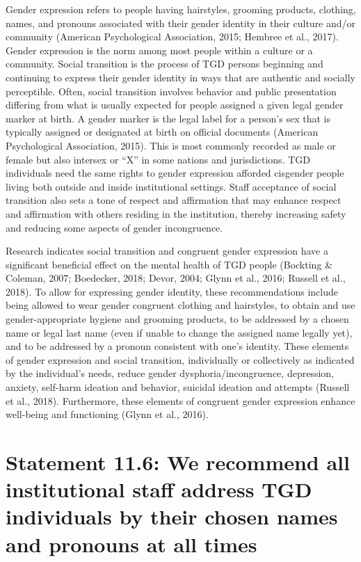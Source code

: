 \documentclass[
]{book}
\begin{document}
Gender expression refers to people having
hairstyles, grooming products, clothing, names,
and pronouns associated with their gender identity in their culture and/or community (American
Psychological Association, 2015; Hembree et al.,
2017). Gender expression is the norm among
most people within a culture or a community.
Social transition is the process of TGD persons
beginning and continuing to express their gender identity in ways that are authentic and
socially perceptible. Often, social transition
involves behavior and public presentation differing from what is usually expected for people
assigned a given legal gender marker at birth.
A gender marker is the legal label for a person's
sex that is typically assigned or designated at
birth on official documents (American
Psychological Association, 2015). This is most
commonly recorded as male or female but also
intersex or ``X'' in some nations and jurisdictions. TGD individuals need the same rights to
gender expression afforded cisgender people
living both outside and inside institutional settings. Staff acceptance of social transition also
sets a tone of respect and affirmation that may
enhance respect and affirmation with others
residing in the institution, thereby increasing
safety and reducing some aspects of gender
incongruence.

Research indicates social transition and congruent gender expression have a significant beneficial effect on the mental health of TGD people
(Bockting \& Coleman, 2007; Boedecker, 2018;
Devor, 2004; Glynn et al., 2016; Russell et al.,
2018). To allow for expressing gender identity,
these recommendations include being allowed to
wear gender congruent clothing and hairstyles,
to obtain and use gender-appropriate hygiene and
grooming products, to be addressed by a chosen
name or legal last name (even if unable to change
the assigned name legally yet), and to be
addressed by a pronoun consistent with one's
identity. These elements of gender expression and
social transition, individually or collectively as
indicated by the individual's needs, reduce gender
dysphoria/incongruence, depression, anxiety,
self-harm ideation and behavior, suicidal ideation
and attempts (Russell et al., 2018). Furthermore,
these elements of congruent gender expression
enhance well-being and functioning (Glynn
et al., 2016).

\hypertarget{statement-11.6-we-recommend-all-institutional-staff-address-tgd-individuals-by-their-chosen-names-and-pronouns-at-all-times}{%
\section*{Statement 11.6: We recommend all institutional staff address TGD individuals by their chosen names and pronouns at all times}\label{statement-11.6-we-recommend-all-institutional-staff-address-tgd-individuals-by-their-chosen-names-and-pronouns-at-all-times}}
\end{document}
